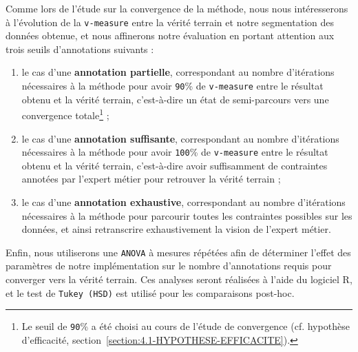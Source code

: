 			Comme lors de l'étude sur la convergence de la méthode, nous nous intéresserons à l'évolution de la \texttt{v-measure} entre la vérité terrain et notre segmentation des données obtenue, et nous affinerons notre évaluation en portant attention aux trois seuils d'annotations suivants :
			\begin{enumerate}
				\item le cas d'une \textbf{annotation partielle}, correspondant au nombre d'itérations nécessaires à la méthode pour avoir \texttt{90}\% de \texttt{v-measure} entre le résultat obtenu et la vérité terrain, c'est-à-dire un état de semi-parcours vers une convergence totale\footnote{Le seuil de \texttt{90}\% a été choisi au cours de l'étude de convergence (cf. hypothèse d'efficacité, section~\ref{section:4.1-HYPOTHESE-EFFICACITE}).} ;
				\item le cas d'une \textbf{annotation suffisante}, correspondant au nombre d'itérations nécessaires à la méthode pour avoir \texttt{100}\% de \texttt{v-measure} entre le résultat obtenu et la vérité terrain, c'est-à-dire avoir suffisamment de contraintes annotées par l'expert métier pour retrouver la vérité terrain ;
				\item le cas d'une \textbf{annotation exhaustive}, correspondant au nombre d'itérations nécessaires à la méthode pour parcourir toutes les contraintes possibles sur les données, et ainsi retranscrire exhaustivement la vision de l'expert métier.
			\end{enumerate}
			
			Enfin, nous utiliserons une \texttt{ANOVA} à mesures répétées afin de déterminer l’effet des paramètres de notre implémentation sur le nombre d’annotations requis pour converger vers la vérité terrain. Ces analyses seront réalisées à l'aide du logiciel R, et le test de \texttt{Tukey (HSD)} est utilisé pour les comparaisons post-hoc.
			
